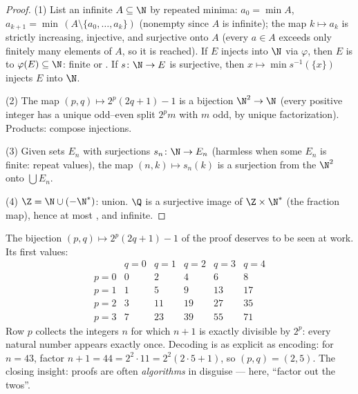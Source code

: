 \begin{proof}
(1) List an infinite $A \subseteq \N$ by repeated minima: $a_0 =
\min A$, $a_{k+1} = \min\,(A \setminus \{a_0, \dots, a_k\})$
(nonempty since $A$ is infinite); the map $k \mapsto a_k$ is strictly
increasing, injective, and surjective onto $A$ (every $a \in A$
exceeds only finitely many elements of $A$, so it is reached). If $E$
injects into $\N$ via $\varphi$, then $E$ is  to
$\varphi(E) \subseteq \N$: finite or . If $s \colon \N \to
E$ is surjective, then $x \mapsto \min s^{-1}(\{x\})$ injects $E$
into $\N$.

(2) The map $(p, q) \mapsto 2^p(2q + 1) - 1$ is a bijection $\N^2
\to \N$ (every positive integer has a unique odd--even split
$2^p m$ with $m$ odd, by unique factorization). Products: compose
injections.

(3) Given sets $E_n$ with surjections $s_n \colon \N \to E_n$
(harmless when some $E_n$ is finite: repeat values), the map $(n, k)
\mapsto s_n(k)$ is a surjection from the  $\N^2$ onto
$\bigcup E_n$.

(4) $\Z = \N \cup (-\N^*)$:  union. $\Q$ is a surjective
image of $\Z \times \N^*$ (the fraction map), hence at most
, and infinite.
\end{proof}

\begin{example}\label{ex:b2:structures:pairing}
The bijection $(p, q) \mapsto 2^p(2q + 1) - 1$ of the proof
deserves to be seen at work. Its first values:
\[
\begin{array}{c|ccccc}
 & q = 0 & q = 1 & q = 2 & q = 3 & q = 4\\
\hline
p = 0 & 0 & 2 & 4 & 6 & 8\\
p = 1 & 1 & 5 & 9 & 13 & 17\\
p = 2 & 3 & 11 & 19 & 27 & 35\\
p = 3 & 7 & 23 & 39 & 55 & 71
\end{array}
\]
Row $p$ collects the integers $n$ for which $n + 1$ is exactly
divisible by $2^p$: every natural number appears exactly once.
Decoding is as explicit as encoding: for $n = 43$, factor $n + 1
= 44 = 2^2\cdot 11 = 2^2(2\cdot5 + 1)$, so $(p, q) = (2, 5)$.
The closing insight:  proofs are often
\emph{algorithms} in disguise --- here, ``factor out the twos''.
\end{example}

